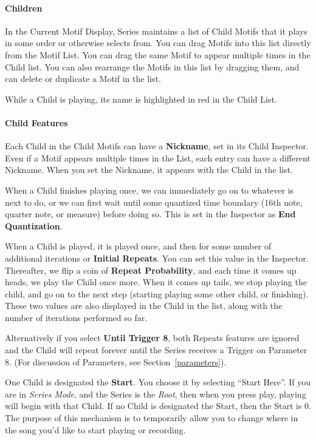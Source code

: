 \documentclass[twoside,10pt]{article}
\begin{document}
\paragraph{Children}

In the Current Motif Display, Series maintains a list of Child Motifs that it plays in some order or otherwise selects from.  You can drag Motifs into this list directly from the Motif List.  You can drag the same Motif to appear multiple times in the Child list.  You can also rearrange the Motifs in this list by dragging them, and can delete or duplicate a Motif in the list.

While a Child is playing, its name is highlighted in red in the Child List.

\paragraph{Child Features}
Each Child in the Child Motifs can have a {\bf Nickname}, set in its Child Inspector.  Even if a Motif appears multiple times in the List, each entry can have a different Nickname.  When you set the Nickname, it appears with the Child in the list.

When a Child finishes playing once, we can immediately go on to whatever is next to do, or we can first wait until some quantized time boundary (16th note, quarter note, or measure) before doing so.  This is set in the Inspector as {\bf End Quantization}.

When a Child is played, it is played once, and then for some number of additional iterations or {\bf Initial Repeats}.  You can set this value in the Inspector.  Thereafter, we flip a coin of {\bf Repeat Probability}, and each time it comes up heads, we play the Child once more. When it comes up tails, we stop playing the child, and go on to the next step (starting playing some other child, or finishing).  These two values are also displayed in the Child in the list, along with the number of iterations performed so far.

Alternatively if you select {\bf Until Trigger 8}, both Repeats features are ignored and the Child  will repeat forever until the Series receives a Trigger on Parameter 8.  (For discussion of Parameters, see Section~\ref{parameters}).

One Child is designated the {\bf Start}.  You choose it by selecting ``Start Here''.  If you are in {\it Series Mode}, and the Series is the {\it Root}, then when you press play, playing will begin with that Child.  If no Child is designated the Start, then the Start is 0.  The purpose of this mechanism is to temporarily allow you to change where in the song you'd like to start playing or recording.
\end{document}
